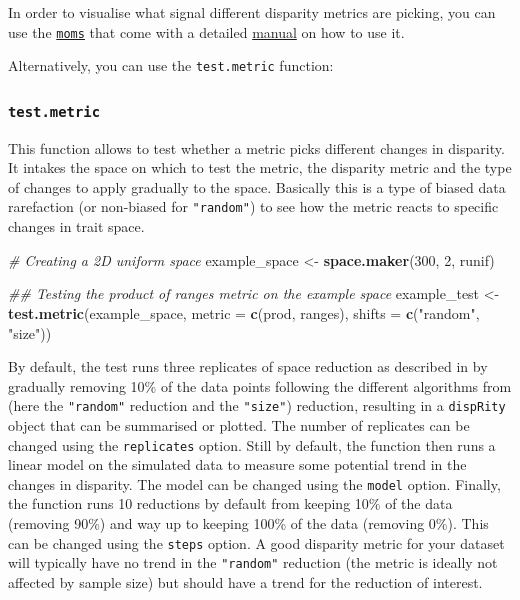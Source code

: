 \documentclass[]{book}
\newenvironment{Shaded}{\begin{snugshade}}{\end{snugshade}}
\newcommand{\CommentTok}[1]{\textcolor[rgb]{0.56,0.35,0.01}{\textit{#1}}}
\newcommand{\DataTypeTok}[1]{\textcolor[rgb]{0.13,0.29,0.53}{#1}}
\newcommand{\DecValTok}[1]{\textcolor[rgb]{0.00,0.00,0.81}{#1}}
\newcommand{\KeywordTok}[1]{\textcolor[rgb]{0.13,0.29,0.53}{\textbf{#1}}}
\newcommand{\NormalTok}[1]{#1}
\newcommand{\StringTok}[1]{\textcolor[rgb]{0.31,0.60,0.02}{#1}}
\begin{document}
In order to visualise what signal different disparity metrics are picking, you can use the \href{https://tguillerme.shinyapps.io/moms/}{\texttt{moms}} that come with a detailed \href{https://rawcdn.githack.com/TGuillerme/moms/master/inst/moms_vignette.html}{manual} on how to use it.

Alternatively, you can use the \texttt{test.metric} function:

\hypertarget{test-metric}{%
\subsubsection{\texorpdfstring{\texttt{test.metric}}{test.metric}}\label{test-metric}}

This function allows to test whether a metric picks different changes in disparity. It intakes the space on which to test the metric, the disparity metric and the type of changes to apply gradually to the space.
Basically this is a type of biased data rarefaction (or non-biased for \texttt{"random"}) to see how the metric reacts to specific changes in trait space.

\begin{Shaded}
\begin{Highlighting}[]
\CommentTok{# Creating a 2D uniform space}
\NormalTok{example_space <-}\StringTok{ }\KeywordTok{space.maker}\NormalTok{(}\DecValTok{300}\NormalTok{, }\DecValTok{2}\NormalTok{, runif)}

\CommentTok{## Testing the product of ranges metric on the example space}
\NormalTok{example_test <-}\StringTok{ }\KeywordTok{test.metric}\NormalTok{(example_space, }\DataTypeTok{metric =} \KeywordTok{c}\NormalTok{(prod, ranges),}
                           \DataTypeTok{shifts =} \KeywordTok{c}\NormalTok{(}\StringTok{"random"}\NormalTok{, }\StringTok{"size"}\NormalTok{)) }
\end{Highlighting}
\end{Shaded}

By default, the test runs three replicates of space reduction as described in \citet{moms} by gradually removing 10\% of the data points following the different algorithms from \citet{moms} (here the \texttt{"random"} reduction and the \texttt{"size"}) reduction, resulting in a \texttt{dispRity} object that can be summarised or plotted.
The number of replicates can be changed using the \texttt{replicates} option.
Still by default, the function then runs a linear model on the simulated data to measure some potential trend in the changes in disparity.
The model can be changed using the \texttt{model} option.
Finally, the function runs 10 reductions by default from keeping 10\% of the data (removing 90\%) and way up to keeping 100\% of the data (removing 0\%).
This can be changed using the \texttt{steps} option.
A good disparity metric for your dataset will typically have no trend in the \texttt{"random"} reduction (the metric is ideally not affected by sample size) but should have a trend for the reduction of interest.
\end{document}
